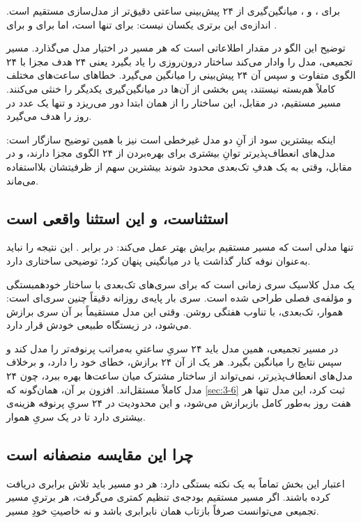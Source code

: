 برای ،  و ، میانگین‌گیری از ۲۴ پیش‌بینی ساعتی
دقیق‌تر از مدل‌سازی مستقیم است. اندازه‌ی این برتری یکسان نیست: برای 
تنها  است، اما برای   و برای 
.

توضیح این الگو در مقدار اطلاعاتی است که هر مسیر در اختیار مدل می‌گذارد. مسیر تجمیعی،
مدل را وادار می‌کند ساختار درون‌روزی را یاد بگیرد  یعنی ۲۴ هدف مجزا با ۲۴
الگوی متفاوت  و سپس آن ۲۴ پیش‌بینی را میانگین می‌گیرد. خطاهای ساعت‌های مختلف
کاملاً هم‌بسته نیستند، پس بخشی از آن‌ها در میانگین‌گیری یکدیگر را خنثی می‌کنند. مسیر
مستقیم، در مقابل، این ساختار را از همان ابتدا دور می‌ریزد و تنها یک عدد در روز را
هدف می‌گیرد.

اینکه بیشترین سود از آنِ دو مدل غیرخطی است نیز با همین توضیح سازگار است: مدل‌های
انعطاف‌پذیرتر توانِ بیشتری برای بهره‌بردن از ۲۴ الگوی مجزا دارند، و در مقابل، وقتی به
یک هدفِ تک‌بعدی محدود شوند بیشترین سهم از ظرفیتشان بلااستفاده می‌ماند.

\subsection*{ استثناست، و این استثنا واقعی است}

 تنها مدلی است که مسیر مستقیم برایش بهتر عمل می‌کند:  در
برابر . این نتیجه را نباید به‌عنوان نوفه کنار گذاشت یا در میانگینی پنهان
کرد؛ توضیحی ساختاری دارد.

 یک مدل کلاسیک سری زمانی است که برای سری‌های تک‌بعدی با ساختار
خودهمبستگی و مؤلفه‌ی فصلی طراحی شده است. سری بار پایه‌ی روزانه دقیقاً چنین سری‌ای است:
هموار، تک‌بعدی، با تناوب هفتگی روشن. وقتی این مدل مستقیماً بر آن سری برازش می‌شود، در
زیستگاه طبیعی خودش قرار دارد.

در مسیر تجمیعی، همین مدل باید ۲۴ سریِ ساعتیِ به‌مراتب پرنوفه‌تر را مدل کند و سپس
نتایج را میانگین بگیرد. هر یک از آن ۲۴ برازش، خطای خود را دارد، و برخلاف مدل‌های
انعطاف‌پذیرتر،  نمی‌تواند از ساختار مشترک میان ساعت‌ها بهره ببرد، چون
۲۴ مدل کاملاً مستقل‌اند. افزون بر آن، همان‌گونه که \cref{sec:3-6} ثبت کرد، این مدل تنها هر
هفت روز به‌طور کامل بازبرازش می‌شود، و این محدودیت در ۲۴ سریِ پرنوفه هزینه‌ی بیشتری
دارد تا در یک سریِ هموار.

\subsection*{چرا این مقایسه منصفانه است}

اعتبار این بخش تماماً به یک نکته بستگی دارد: هر دو مسیر باید تلاش برابری دریافت کرده
باشند. اگر مسیر مستقیم بودجه‌ی تنظیم کمتری می‌گرفت، هر برتریِ مسیر تجمیعی می‌توانست
صرفاً بازتاب همان نابرابری باشد و نه خاصیتِ خودِ مسیر.

